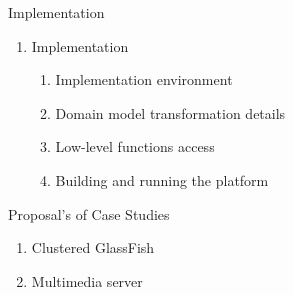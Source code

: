 \documentclass{beamer}
\begin{document}
\setcounter{enumi_chapter}{\value{enumi}}


\begin{frame}{Implementation}

	\begin{enumerate}
		\setcounter{enumi}{\value{enumi_chapter}}

	\item Implementation

		\begin{enumerate}
			\item Implementation environment
			\item Domain model transformation details
			\item Low-level functions access
			\item Building and running the platform
		\end{enumerate}

	\end{enumerate}

\end{frame}

\setcounter{enumi_chapter}{\value{enumi}}


\begin{frame}{Proposal's of Case Studies}

	\begin{enumerate}
		\setcounter{enumi}{\value{enumi_chapter}}

		\item Clustered GlassFish
		\item Multimedia server

	
	\end{enumerate}

\end{frame}
\end{document}
